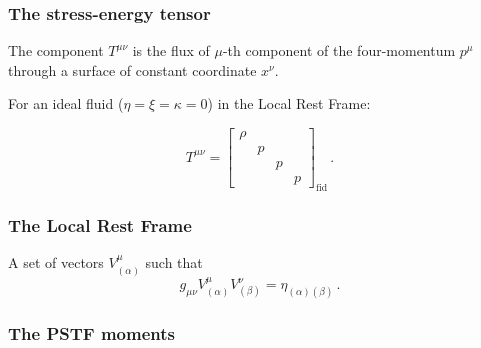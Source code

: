 \documentclass{beamer}
\begin{document}
\begin{frame}
    \frametitle{The stress-energy tensor}

    The component \(T^{\mu\nu}\) is the flux of \(\mu\)-th component of the four-momentum \(p^\mu\) through a surface of constant coordinate \(x^\nu\).

    For an ideal fluid (\(\eta = \xi = \kappa = 0\)) in the Local Rest Frame:

    \begin{equation*}
        T^{\mu\nu} =
        \begin{bmatrix}
        \rho   &   &   &  \\
           & p  &   &  \\
           &   & p  &  \\
           &   &   & p
       \end{bmatrix}_{\text{fid}} \,.
    \end{equation*}
\end{frame}

\begin{frame}
    \frametitle{The Local Rest Frame}

    A set of vectors \(V^\mu _{(\alpha)}\)  such that
    \begin{equation*}
        g_{\mu\nu} V^\mu _{(\alpha)} V^\nu _{(\beta)} = \eta_{(\alpha) (\beta)}\,.
    \end{equation*}
\end{frame}

\begin{frame}
    \frametitle{The PSTF moments}
\end{frame}
\end{document}
